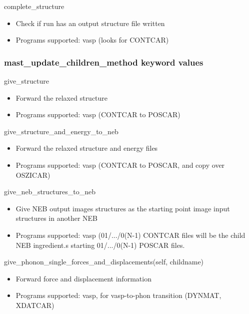 \documentclass[letterpaper,10pt,english]{sphinxmanual}
\begin{document}
complete\_structure
\begin{itemize}
\item {} 
Check if run has an output structure file written

\item {} 
Programs supported: vasp (looks for CONTCAR)

\end{itemize}


\subsubsection{mast\_update\_children\_method keyword values}
\label{3_0_inputfile:mast-update-children-method-keyword-values}
give\_structure
\begin{itemize}
\item {} 
Forward the relaxed structure

\item {} 
Programs supported: vasp (CONTCAR to POSCAR)

\end{itemize}

give\_structure\_and\_energy\_to\_neb
\begin{itemize}
\item {} 
Forward the relaxed structure and energy files

\item {} 
Programs supported: vasp (CONTCAR to POSCAR, and copy over OSZICAR)

\end{itemize}

give\_neb\_structures\_to\_neb
\begin{itemize}
\item {} 
Give NEB output images structures as the starting point image input structures in another NEB

\item {} 
Programs supported: vasp (01/.../0(N-1) CONTCAR files will be the child NEB ingredient.s starting 01/.../0(N-1) POSCAR files.

\end{itemize}

give\_phonon\_single\_forces\_and\_displacements(self, childname)
\begin{itemize}
\item {} 
Forward force and displacement information

\item {} 
Programs supported: vasp, for vasp-to-phon transition (DYNMAT, XDATCAR)

\end{itemize}
\end{document}
